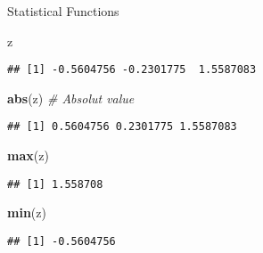 \documentclass[ignorenonframetext,]{beamer}
\newenvironment{Shaded}{\begin{snugshade}}{\end{snugshade}}
\newcommand{\CommentTok}[1]{\textcolor[rgb]{0.56,0.35,0.01}{\textit{#1}}}
\newcommand{\KeywordTok}[1]{\textcolor[rgb]{0.13,0.29,0.53}{\textbf{#1}}}
\newcommand{\NormalTok}[1]{#1}
\begin{document}
\begin{frame}[fragile]{Statistical Functions}
\protect\hypertarget{statistical-functions}{}

\begin{Shaded}
\begin{Highlighting}[]
\NormalTok{z}
\end{Highlighting}
\end{Shaded}

\begin{verbatim}
## [1] -0.5604756 -0.2301775  1.5587083
\end{verbatim}

\begin{Shaded}
\begin{Highlighting}[]
\KeywordTok{abs}\NormalTok{(z) }\CommentTok{# Absolut value}
\end{Highlighting}
\end{Shaded}

\begin{verbatim}
## [1] 0.5604756 0.2301775 1.5587083
\end{verbatim}

\begin{Shaded}
\begin{Highlighting}[]
\KeywordTok{max}\NormalTok{(z)}
\end{Highlighting}
\end{Shaded}

\begin{verbatim}
## [1] 1.558708
\end{verbatim}

\begin{Shaded}
\begin{Highlighting}[]
\KeywordTok{min}\NormalTok{(z)}
\end{Highlighting}
\end{Shaded}

\begin{verbatim}
## [1] -0.5604756
\end{verbatim}

\end{frame}
\end{document}
